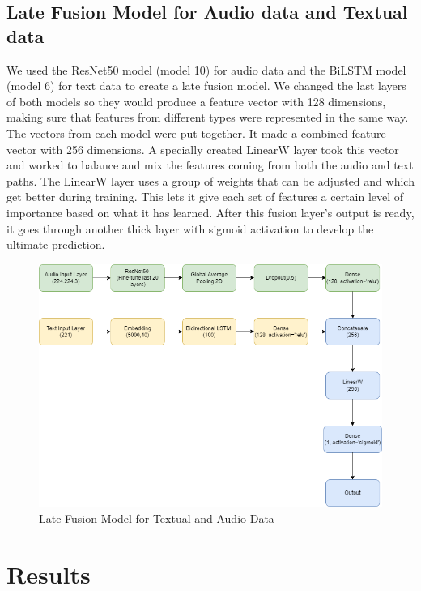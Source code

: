 \documentclass[12pt]{article}
\begin{document}
\subsection{Late Fusion Model for Audio data and Textual data}
We used the ResNet50 model (model 10) for audio data and the BiLSTM model (model 6) for text data to create a late fusion model. We changed the last layers of both models so they would produce a feature vector with 128 dimensions, making sure that features from different types were represented in the same way. The vectors from each model were put together. It made a combined feature vector with 256 dimensions. A specially created LinearW layer took this vector and worked to balance and mix the features coming from both the audio and text paths. The LinearW layer uses a group of weights that can be adjusted and which get better during training. This lets it give each set of features a certain level of importance based on what it has learned. After this fusion layer's output is ready, it goes through another thick layer with sigmoid activation to develop the ultimate prediction.
\begin{figure}[H]
    \centering
    \includegraphics[width=1.1\linewidth]{DetailLateFusion.png}
    \caption{Late Fusion Model for Textual and Audio Data}
    \label{fig:enter-label}
\end{figure}
\section{Results}
\label{sec:results}
\end{document}
